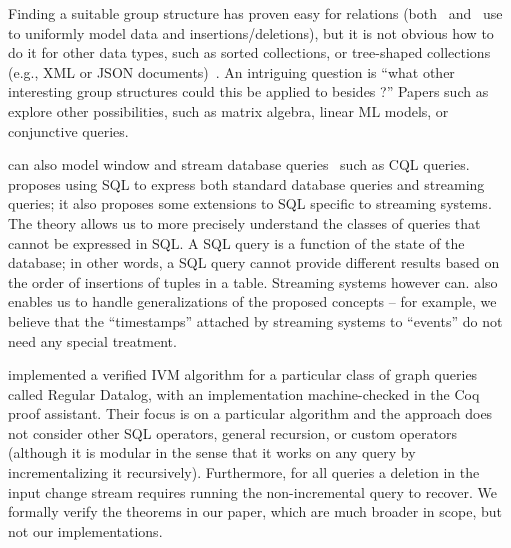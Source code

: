 Finding a suitable group structure has proven easy for relations
(both~\cite{koch-pods10} and~\cite{green-tcs11} use \zrs to uniformly
model data and insertions/deletions), but it is not obvious how to do
it for other data types, such as sorted collections, or tree-shaped
collections (e.g., XML or JSON documents)~\cite{foster-planx08}.  An
intriguing question is ``what other interesting group structures could
this be applied to besides \zrs?''  Papers such
as~\cite{nikolic-icmd18} explore other possibilities, such as matrix
algebra, linear ML models, or conjunctive queries.

\dbsp can also model window and stream database
queries~\cite{arasu-tr02,aurora} such as CQL queries.
\cite{begoli-sigmod19} proposes using SQL to express both standard
database queries and streaming queries; it also proposes some
extensions to SQL specific to streaming systems.  The \dbsp theory
allows us to more precisely understand the classes of queries that
cannot be expressed in SQL.  A SQL query is a function of the state of
the database; in other words, a SQL query cannot provide different
results based on the order of insertions of tuples in a table.
Streaming systems however can.  \dbsp also enables us to handle
generalizations of the proposed concepts -- for example, we believe
that the ``timestamps'' attached by streaming systems to ``events'' do
not need any special treatment.

\cite{bonifati-iclp2018} implemented a verified IVM algorithm for a
particular class of graph queries called Regular Datalog, with an
implementation machine-checked in the Coq proof assistant. Their focus
is on a particular algorithm and the approach does not consider other
SQL operators, general recursion, or custom operators (although it is
modular in the sense that it works on any query by incrementalizing it
recursively). Furthermore, for all queries a deletion in the input
change stream requires running the non-incremental query to recover.
We formally verify the theorems in our paper, which are much broader
in scope, but not our implementations.

